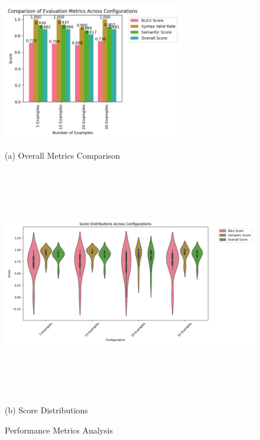 \documentclass[11pt,a4paper]{article}
\begin{document}
\begin{figure}[!t]
    \centering
    \begin{minipage}{0.95\columnwidth}
        \includegraphics[width=1.1\linewidth,height=6cm,keepaspectratio]{Graphs/overall_metrics_comparison.png}
        \vspace{-0.2cm}
        \caption*{(a) Overall Metrics Comparison}
        \label{fig:overall-metrics-comparison}
    \end{minipage}
    \vspace{0.1cm}
    
    \begin{minipage}{0.95\columnwidth}
        \includegraphics[width=1.1\linewidth,height=10cm,keepaspectratio]{Graphs/score_distributions.png}
        \vspace{-0.2cm}
        \caption*{(b) Score Distributions}
    \end{minipage}
    \vspace{-0.2cm}
    \caption{Performance Metrics Analysis}
    \label{fig:metrics-analysis}
\end{figure}
\end{document}
